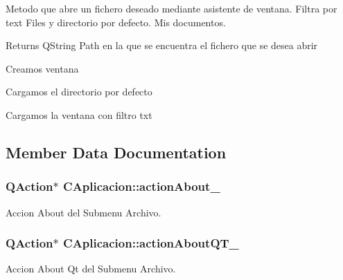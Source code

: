 Metodo que abre un fichero deseado mediante asistente de ventana. Filtra por text Files y directorio por defecto. Mis documentos. 

\begin{DoxyReturn}{Returns}
Q\+String Path en la que se encuentra el fichero que se desea abrir 
\end{DoxyReturn}
Creamos ventana

Cargamos el directorio por defecto

Cargamos la ventana con filtro txt 

\subsection{Member Data Documentation}
\subsubsection[{\texorpdfstring{action\+About\+\_\+}{actionAbout_}}]{\setlength{\rightskip}{0pt plus 5cm}Q\+Action$\ast$ C\+Aplicacion\+::action\+About\+\_\+\hspace{0.3cm}{\ttfamily [private]}}\hypertarget{classCAplicacion_ac42dda1caacc0506c7015c79fde8416f}{}\label{classCAplicacion_ac42dda1caacc0506c7015c79fde8416f}


Accion About del Submenu Archivo. 

\subsubsection[{\texorpdfstring{action\+About\+Q\+T\+\_\+}{actionAboutQT_}}]{\setlength{\rightskip}{0pt plus 5cm}Q\+Action$\ast$ C\+Aplicacion\+::action\+About\+Q\+T\+\_\+\hspace{0.3cm}{\ttfamily [private]}}\hypertarget{classCAplicacion_af0ed23ead2d1c3aea79b724c3cb70249}{}\label{classCAplicacion_af0ed23ead2d1c3aea79b724c3cb70249}


Accion About Qt del Submenu Archivo. 

